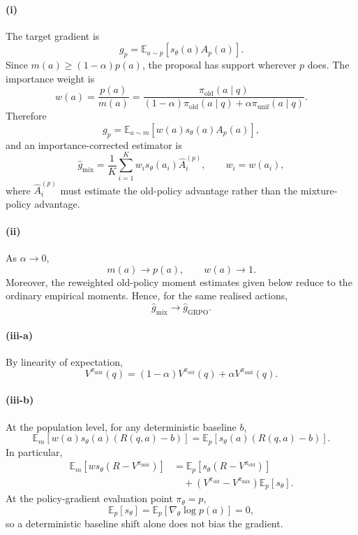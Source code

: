 \paragraph{(i)}
The target gradient is
\[
g_p
=
\mathbb{E}_{a\sim p}[s_\theta(a)A_p(a)].
\]
Since $m(a)\geq(1-\alpha)p(a)$, the proposal has support wherever $p$ does.
The importance weight is
\[
\boxed{
w(a)
=
\frac{p(a)}{m(a)}
=
\frac{
\pi_{\mathrm{old}}(a\mid q)
}{
(1-\alpha)\pi_{\mathrm{old}}(a\mid q)
+\alpha\pi_{\mathrm{unif}}(a\mid q)
}.
}
\]
Therefore
\[
g_p
=
\mathbb{E}_{a\sim m}
\left[
w(a)s_\theta(a)A_p(a)
\right],
\]
and an importance-corrected estimator is
\[
\boxed{
\hat g_{\mathrm{mix}}
=
\frac{1}{K}
\sum_{i=1}^K
w_i s_\theta(a_i)\hat A_i^{(p)},
\qquad
w_i=w(a_i),
}
\]
where $\hat A_i^{(p)}$ must estimate the old-policy advantage rather than the
mixture-policy advantage.

\paragraph{(ii)}
As $\alpha\to0$,
\[
m(a)\to p(a),
\qquad
w(a)\to1.
\]
Moreover, the reweighted old-policy moment estimates given below reduce to the
ordinary empirical moments. Hence, for the same realised actions,
\[
\boxed{
\hat g_{\mathrm{mix}}\longrightarrow\hat g_{\mathrm{GRPO}}.
}
\]

\paragraph{(iii-a)}
By linearity of expectation,
\[
\boxed{
V^{\pi_{\mathrm{mix}}}(q)
=
(1-\alpha)V^{\pi_{\mathrm{old}}}(q)
+
\alpha V^{\pi_{\mathrm{unif}}}(q).
}
\]

\paragraph{(iii-b)}
At the population level, for any deterministic baseline $b$,
\[
\mathbb{E}_{m}
\left[
w(a)s_\theta(a)(R(q,a)-b)
\right]
=
\mathbb{E}_{p}
\left[
s_\theta(a)(R(q,a)-b)
\right].
\]
In particular,
\begin{align*}
\mathbb{E}_{m}
\left[
w s_\theta(R-V^{\pi_{\mathrm{mix}}})
\right]
&=
\mathbb{E}_{p}
\left[
s_\theta(R-V^{\pi_{\mathrm{old}}})
\right]\\
&\quad+
\left(
V^{\pi_{\mathrm{old}}}
-
V^{\pi_{\mathrm{mix}}}
\right)
\mathbb{E}_{p}[s_\theta].
\end{align*}
At the policy-gradient evaluation point $\pi_\theta=p$,
\[
\mathbb{E}_{p}[s_\theta]
=
\mathbb{E}_{p}[\nabla_\theta\log p(a)]
=0,
\]
so a deterministic baseline shift alone does not bias the gradient.

